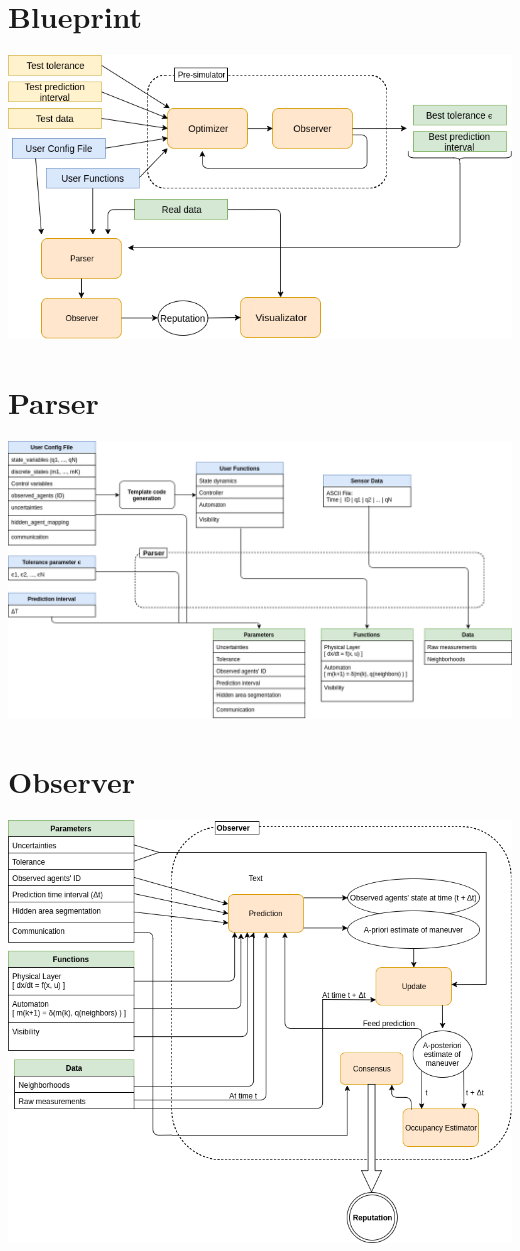\documentclass[11pt]{article}
\begin{document}
\section{Blueprint}
\includegraphics[width=\textwidth]{Blueprint}
\section{Parser}
\includegraphics[width=\textwidth]{Parser}
\section{Observer}
\includegraphics[width=\textwidth]{Observer}
\end{document}
